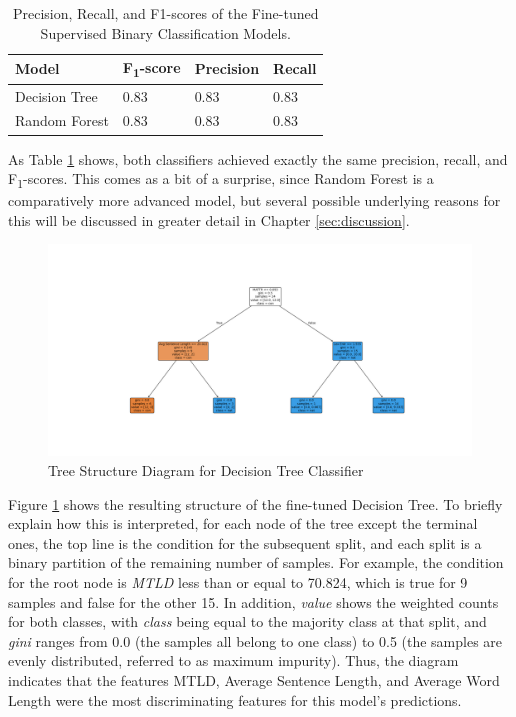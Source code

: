 \documentclass[12pt,a4paper]{article}
\numberwithin{figure}{section}
\numberwithin{table}{section}
\numberwithin{definition}{section}
\begin{document}
\begin{table}[!h]
  \centering
  \caption{Precision, Recall, and F1-scores of the Fine-tuned Supervised Binary Classification Models.}
  \renewcommand{\arraystretch}{1.0}
  \begin{tabular}{|l|l|l|l|}
  \hline
      \textbf{Model} & \textbf{F\textsubscript{1}-score} & \textbf{Precision} & \textbf{Recall} \\ \hline
      Decision Tree & 0.83 & 0.83 & 0.83 \\ 
      Random Forest & 0.83 & 0.83 & 0.83 \\ \hline
  \end{tabular}
  \label{tbl:supervisedevaluation}
\end{table}

As Table \ref{tbl:supervisedevaluation} shows, both classifiers achieved exactly the same precision, recall, and F\textsubscript{1}-scores. This comes as a bit of a surprise, since Random Forest is a comparatively more advanced model, but several possible underlying reasons for this will be discussed in greater detail in Chapter \ref{sec:discussion}.

\begin{figure}[!h]
  \centering
        \includegraphics[width=1.0\textwidth]{decisiontree.png}
        \caption{Tree Structure Diagram for Decision Tree Classifier}
        \label{fig:decisiontree}
\end{figure}

Figure \ref{fig:decisiontree} shows the resulting structure of the fine-tuned Decision Tree. To briefly explain how this is interpreted, for each node of the tree except the terminal ones, the top line is the condition for the subsequent split, and each split is a binary partition of the remaining number of samples. For example, the condition for the root node is \textit{MTLD} less than or equal to 70.824, which is true for 9 samples and false for the other 15. In addition, \textit{value} shows the weighted counts for both classes, with \textit{class} being equal to the majority class at that split, and \textit{gini} ranges from 0.0 (the samples all belong to one class) to 0.5 (the samples are evenly distributed, referred to as maximum impurity). Thus, the diagram indicates that the features MTLD, Average Sentence Length, and Average Word Length were the most discriminating features for this model's predictions. 
\end{document}
